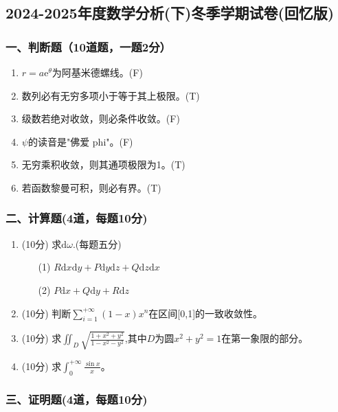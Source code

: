 \subsection{2024-2025年度数学分析(下)冬季学期试卷(回忆版)}

\subsubsection*{一、判断题（10道题，一题2分）}

\begin{enumerate}
    \item \(r=a \mathrm{e}^{\theta}\)为阿基米德螺线。\hfill (F)
    \item 数列必有无穷多项小于等于其上极限。\hfill (T)
    \item 级数若绝对收敛，则必条件收敛。\hfill (F)
    \item \(\psi\)的读音是"佛爱 phi"。\hfill (F)
    \item 无穷乘积收敛，则其通项极限为1。\hfill (T)
    \item 若函数黎曼可积，则必有界。\hfill (T)
\end{enumerate}

\subsubsection*{二、计算题(4道，每题10分)}

\begin{enumerate}
    \item (10分) 求\(\mathrm{d} \omega\).(每题五分)
    \begin{enumerate}
        \item[(1)] \(R \mathrm{d}x \mathrm{d}y+P \mathrm{d}y \mathrm{d}z+ Q \mathrm{d}z \mathrm{d}x\)
        \item[(2)] \(P \mathrm{d}x +Q \mathrm{d}y + R \mathrm{d}z\)
    \end{enumerate}

    \item (10分) 判断\(\sum_{i=1}^{+\infty}(1-x)x^{n}\)在区间[0,1]的一致收敛性。

    \item (10分) 求\(\iint_D \sqrt{\frac{1+x^2+y^2}{1-x^2-y^2}}\),其中\(D\)为圆\(x^2+y^2=1\)在第一象限的部分。

    \item (10分) 求\(\int_0^{+\infty}\frac{\sin x}{x}\)。
\end{enumerate}

\subsubsection*{三、证明题(4道，每题10分)}


